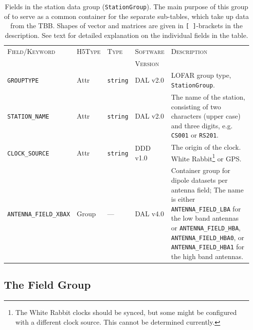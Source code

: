 \documentclass[a4paper,10pt,bibtotoc]{scrartcl}
\begin{document}

\begin{table}[htbp]
  \centering
  \begin{tabular}{|llllp{4.5cm}|}
    \hline
    \textsc{Field/Keyword} & \textsc{H5Type} & \textsc{Type} & \textsc{Software} & \textsc{Description} \\
                           &                 &               & \textsc{Version}  &                      \\
    \hline
    \hline
    \small {\texttt{GROUPTYPE}} & Attr & \verb|string| & DAL v2.0 & LOFAR group type, \texttt{StationGroup}. \\
    \small {\texttt{STATION\_NAME}} & Attr & \verb|string| & DAL v2.0 & The name of the station, consisting of two characters (upper case) and three digits, e.g. \texttt{CS001} or \texttt{RS201}. \\
    \small {\texttt{CLOCK\_SOURCE}} & Attr & \verb|string| & DDD v1.0 & The origin of the clock. White Rabbit\footnote{The White Rabbit clocks should be synced, but some might be configured with a different clock source. This cannot be determined currently.} or GPS. \\
    \small {\texttt{ANTENNA\_FIELD\_XBAX}} & Group & --- & DAL v4.0 & Container group for dipole datasets per antenna field; The name is either \texttt{ANTENNA\_FIELD\_LBA} for the low band antennas or \texttt{ANTENNA\_FIELD\_HBA}, \texttt{ANTENNA\_FIELD\_HBA0}, or \texttt{ANTENNA\_FIELD\_HBA1} for the high band antennas. \\
    \hline
  \end{tabular}
  \caption[Fields in the station data group (\texttt{StationGroup}).]{
    Fields in the station data group (\texttt{StationGroup}). The
    main purpose of this group of to serve as a common container for the separate
    sub-tables, which take up data from the TBB. Shapes of vector and matrices are given in
    \texttt{[ ]}-brackets in the description. See text for detailed explanation
    on the individual fields in the table.}
    
  \label{tab:station group}
\end{table}


\subsection{The Field Group}
\label{sec:field group}
\end{document}

